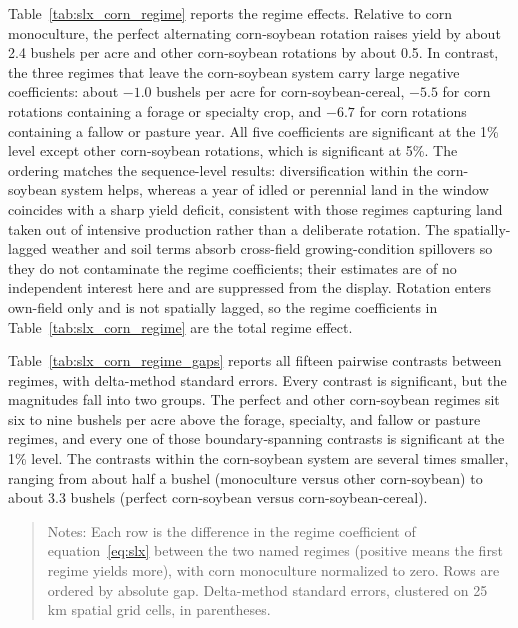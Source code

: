 \documentclass[12pt,letterpaper]{article}
\theoremstyle{remark}
\theoremstyle{remark}
\let\oldtable\table
\let\endoldtable\endtable
\renewenvironment{table}[1][H]{\oldtable[H]}{\endoldtable}
\theoremstyle{plain}
\theoremstyle{definition}
\begin{document}
Table~\ref{tab:slx_corn_regime} reports the regime effects. Relative to corn monoculture, the perfect alternating corn-soybean rotation raises yield by about 2.4 bushels per acre and other corn-soybean rotations by about 0.5. In contrast, the three regimes that leave the corn-soybean system carry large negative coefficients: about $-1.0$ bushels per acre for corn-soybean-cereal, $-5.5$ for corn rotations containing a forage or specialty crop, and $-6.7$ for corn rotations containing a fallow or pasture year. All five coefficients are significant at the 1\% level except other corn-soybean rotations, which is significant at 5\%. The ordering matches the sequence-level results: diversification within the corn-soybean system helps, whereas a year of idled or perennial land in the window coincides with a sharp yield deficit, consistent with those regimes capturing land taken out of intensive production rather than a deliberate rotation. The spatially-lagged weather and soil terms absorb cross-field growing-condition spillovers so they do not contaminate the regime coefficients; their estimates are of no independent interest here and are suppressed from the display. Rotation enters own-field only and is not spatially lagged, so the regime coefficients in Table~\ref{tab:slx_corn_regime} are the total regime effect.

Table~\ref{tab:slx_corn_regime_gaps} reports all fifteen pairwise contrasts between regimes, with delta-method standard errors. Every contrast is significant, but the magnitudes fall into two groups. The perfect and other corn-soybean regimes sit six to nine bushels per acre above the forage, specialty, and fallow or pasture regimes, and every one of those boundary-spanning contrasts is significant at the 1\% level. The contrasts within the corn-soybean system are several times smaller, ranging from about half a bushel (monoculture versus other corn-soybean) to about 3.3 bushels (perfect corn-soybean versus corn-soybean-cereal).

\begin{table}[H]
  \centering
  \caption{Pairwise yield gaps between rotation regimes.}
  \label{tab:slx_corn_regime_gaps}
  
\end{table}
\begin{quote}
\small
Notes: Each row is the difference in the regime coefficient of equation~\eqref{eq:slx} between the two named regimes (positive means the first regime yields more), with corn monoculture normalized to zero. Rows are ordered by absolute gap. Delta-method standard errors, clustered on 25\, km spatial grid cells, in parentheses.
\end{quote}
\end{document}
